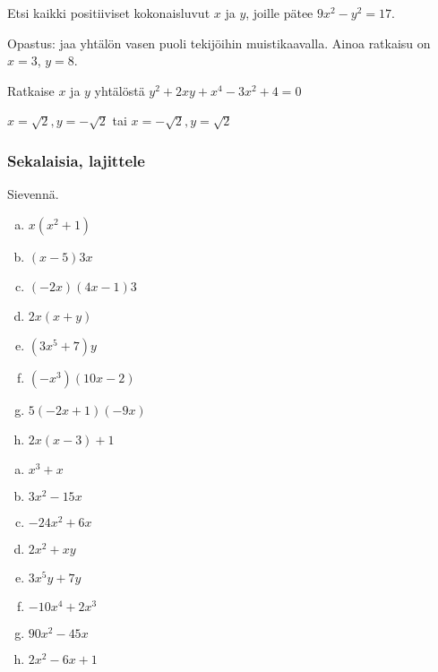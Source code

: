 \begin{tehtava} %
    Etsi kaikki positiiviset kokonaisluvut $x$ ja $y$, joille pätee $9x^2-y^2=17$.
    \begin{vastaus}
    Opastus: jaa yhtälön vasen puoli tekijöihin muistikaavalla. 
    Ainoa ratkaisu on $x = 3$, $y=8$.    
    \end{vastaus}
\end{tehtava}

\begin{tehtava} %
    Ratkaise $x$ ja $y$ yhtälöstä $y^2+2xy+x^4-3x^2+4=0$
    \begin{vastaus}
        $x=\sqrt{2}, y=-\sqrt{2}$ tai $x=-\sqrt{2}, y=\sqrt{2}$
    \end{vastaus}
\end{tehtava}

\subsubsection*{Sekalaisia, lajittele}

\begin{tehtava}
    Sievennä.
    \begin{enumerate}[a)]
        \item $x(x^2 + 1)$
        \item $(x - 5)3x$
        \item $(-2x)(4x - 1)3$
        \item $2x(x + y)$
        \item $(3x^5 + 7)y$
        \item $(-x^3)(10x - 2)$
        \item $5(-2x + 1)(-9x) $
        \item $2x(x-3)+1$
    \end{enumerate}
    \begin{vastaus}
        \begin{enumerate}[a)]
            \item $x^3 + x$
            \item $3x^2 - 15x$
            \item $-24x^2 + 6x$
            \item $2x^2 + xy$
            \item $3x^5y + 7y$
            \item $-10x^4 + 2x^3$
            \item $90x^2 - 45x$
            \item $2x^2-6x+1$
        \end{enumerate}
    \end{vastaus}
\end{tehtava}

